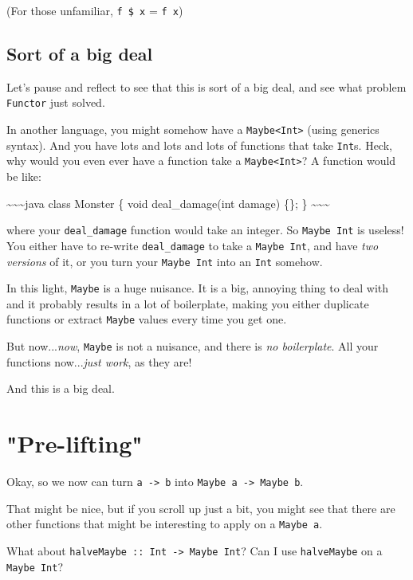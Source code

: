 \documentclass[]{article}
\begin{document}
(For those unfamiliar, \texttt{f\ \$\ x} = \texttt{f\ x})

\subsection{Sort of a big deal}

Let's pause and reflect to see that this is sort of a big deal, and see what
problem \texttt{Functor} just solved.

In another language, you might somehow have a
\texttt{Maybe\textless{}Int\textgreater{}} (using generics syntax). And you have
lots and lots and lots of functions that take \texttt{Int}s. Heck, why would you
even ever have a function take a \texttt{Maybe\textless{}Int\textgreater{}}? A
function would be like:

\textasciitilde{}\textasciitilde{}\textasciitilde{}java class Monster \{ void
deal\_damage(int damage) \{\}; \}
\textasciitilde{}\textasciitilde{}\textasciitilde{}

where your \texttt{deal\_damage} function would take an integer. So
\texttt{Maybe\ Int} is useless! You either have to re-write
\texttt{deal\_damage} to take a \texttt{Maybe\ Int}, and have \emph{two
versions} of it, or you turn your \texttt{Maybe\ Int} into an \texttt{Int}
somehow.

In this light, \texttt{Maybe} is a huge nuisance. It is a big, annoying thing to
deal with and it probably results in a lot of boilerplate, making you either
duplicate functions or extract \texttt{Maybe} values every time you get one.

But now...\emph{now}, \texttt{Maybe} is not a nuisance, and there is \emph{no
boilerplate}. All your functions now...\emph{just work}, as they are!

And this is a big deal.

\section{"Pre-lifting"}

Okay, so we now can turn \texttt{a\ -\textgreater{}\ b} into
\texttt{Maybe\ a\ -\textgreater{}\ Maybe\ b}.

That might be nice, but if you scroll up just a bit, you might see that there
are other functions that might be interesting to apply on a \texttt{Maybe\ a}.

What about \texttt{halveMaybe\ ::\ Int\ -\textgreater{}\ Maybe\ Int}? Can I use
\texttt{halveMaybe} on a \texttt{Maybe\ Int}?
\end{document}
